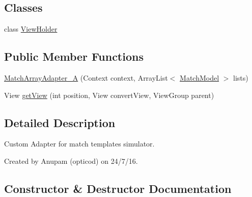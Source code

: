 \subsection*{Classes}
\begin{DoxyCompactItemize}
\item 
class \hyperlink{classorg_1_1buildmlearn_1_1toolkit_1_1matchtemplate_1_1adapter_1_1MatchArrayAdapter__A_1_1ViewHolder}{View\+Holder}
\end{DoxyCompactItemize}
\subsection*{Public Member Functions}
\begin{DoxyCompactItemize}
\item 
\hyperlink{classorg_1_1buildmlearn_1_1toolkit_1_1matchtemplate_1_1adapter_1_1MatchArrayAdapter__A_a2d146eccd4c0ce724a6104fde49d2091}{Match\+Array\+Adapter\+\_\+A} (Context context, Array\+List$<$ \hyperlink{classorg_1_1buildmlearn_1_1toolkit_1_1matchtemplate_1_1data_1_1MatchModel}{Match\+Model} $>$ lists)
\item 
View \hyperlink{classorg_1_1buildmlearn_1_1toolkit_1_1matchtemplate_1_1adapter_1_1MatchArrayAdapter__A_ab5eb1a15b5d86c906797e8ce8082b2a2}{get\+View} (int position, View convert\+View, View\+Group parent)
\end{DoxyCompactItemize}


\subsection{Detailed Description}
Custom Adapter for match template\textquotesingle{}s simulator. 

Created by Anupam (opticod) on 24/7/16. 

\subsection{Constructor \& Destructor Documentation}
